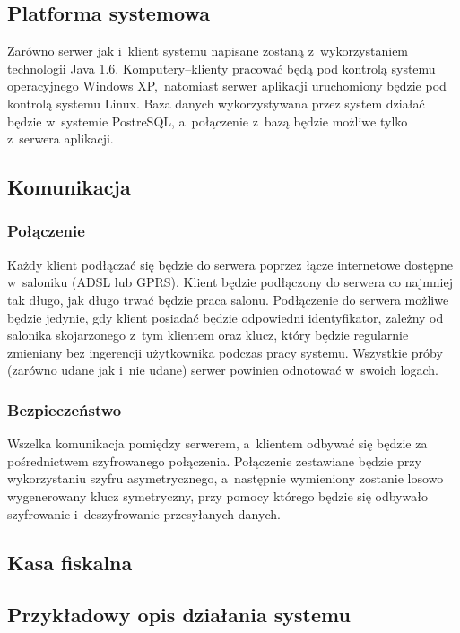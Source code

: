\subsection{Platforma systemowa}
Zarówno serwer jak i~klient systemu napisane zostaną z~wykorzystaniem technologii Java 1.6. Komputery--klienty pracować będą pod kontrolą systemu operacyjnego Windows XP\texttrademark ,~natomiast serwer aplikacji uruchomiony będzie pod kontrolą systemu Linux. Baza danych wykorzystywana przez system działać będzie w~systemie PostreSQL, a~połączenie z~bazą będzie możliwe tylko z~serwera aplikacji.
\subsection{Komunikacja}
\subsubsection{Połączenie}
Każdy klient podłączać się będzie do serwera poprzez łącze internetowe dostępne w~saloniku (ADSL lub GPRS). Klient będzie podłączony do serwera co najmniej tak długo, jak długo trwać będzie praca salonu. Podłączenie do serwera możliwe będzie jedynie, gdy klient posiadać będzie odpowiedni identyfikator, zależny od salonika skojarzonego z~tym klientem oraz klucz, który będzie regularnie zmieniany bez ingerencji użytkownika podczas pracy systemu. Wszystkie próby (zarówno udane jak i~nie udane) serwer powinien odnotować w~swoich logach.
\subsubsection{Bezpieczeństwo}
Wszelka komunikacja pomiędzy serwerem, a~klientem odbywać się będzie za pośrednictwem szyfrowanego połączenia. Połączenie zestawiane będzie przy wykorzystaniu szyfru asymetrycznego, a~następnie wymieniony zostanie losowo wygenerowany klucz symetryczny, przy pomocy którego będzie się odbywało szyfrowanie i~deszyfrowanie przesyłanych danych.
\subsection{Kasa fiskalna}

\subsection{Przykładowy opis działania systemu}
